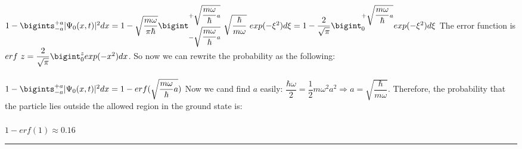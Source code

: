 \documentclass[fleqn]{article}
\begin{document}
\begin{itemize}
{        \\
        \\
        $
          1-\bigints_{-a}^{+a} |\Psi_0(x,t)|^2 dx=1-\sqrt{\dfrac{m \omega}{\pi \hbar}} \bigint_{-\sqrt{\dfrac{m \omega}{\hbar}a}}^{+\sqrt{\dfrac{m \omega}{\hbar}a}} ~ \sqrt{\dfrac{\hbar}{m \omega}} ~ exp(-\xi^2) d\xi \\
          \\
          \\
          =1-\dfrac{2}{\sqrt{\pi}} \bigint_{0}^{+\sqrt{\dfrac{m \omega}{\hbar}a}} exp(-\xi^2) d\xi \\
          \\
        $
        The error function is $erf ~ z=\dfrac{2}{\sqrt{\pi}} \bigint_{0}^{z} exp(-x^2) dx$. So now we can rewrite 
        the probability as the following: \\
        \\
        $
          1-\bigints_{-a}^{+a} |\Psi_0(x,t)|^2 dx=1-erf(\sqrt{\dfrac{m \omega}{\hbar}a}) \\ \\
        $
        Now we cand find $a$ easily: $\dfrac{\hbar \omega}{2}=\dfrac{1}{2} m \omega^2 a^2 \Longrightarrow a=\sqrt{\dfrac{\hbar}{m \omega}}$.
        Therefore, the probability that the particle lies outside the allowed region in the ground state is: \\
        \\
        $
          1-erf(1) \approx 0.16
        $
      }

  \end{itemize}

  \rule{15cm}{1pt}
\end{document}
